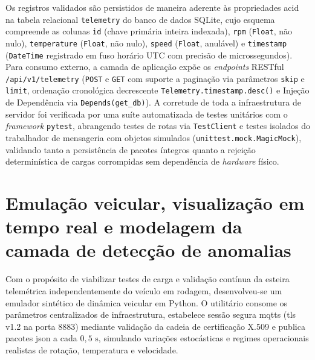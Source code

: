 \documentclass[
	12pt,				%
	openright,			%
	twoside,			%
	a4paper,			%
	english,			%
	brazil				%
	]{abntex2}
\begin{document}
Os registros validados são persistidos de maneira aderente às propriedades
\acrshort{acid} na tabela relacional \texttt{telemetry} do banco de dados SQLite, cujo
esquema compreende as colunas \texttt{id} (chave primária inteira indexada),
\texttt{rpm} (\texttt{Float}, não nulo), \texttt{temperature} (\texttt{Float}, não
nulo), \texttt{speed} (\texttt{Float}, anulável) e \texttt{timestamp} (\texttt{DateTime}
registrado em fuso horário UTC com precisão de microssegundos). Para consumo externo, a
camada de aplicação expõe os \textit{endpoints} RESTful \texttt{/api/v1/telemetry}
(\texttt{POST} e \texttt{GET} com suporte a paginação via parâmetros \texttt{skip} e
\texttt{limit}, ordenação cronológica decrescente
\texttt{Telemetry.\allowbreak timestamp.\allowbreak desc()} e Injeção de Dependência via
\texttt{Depends(get\_db)}). A corretude de toda a infraestrutura de servidor foi
verificada por uma suíte automatizada de testes unitários com o \textit{framework}
\texttt{pytest}, abrangendo testes de rotas via \texttt{TestClient} e testes isolados do
trabalhador de mensageria com objetos simulados
(\texttt{unittest.\allowbreak mock.\allowbreak MagicMock}), validando tanto a
persistência de pacotes íntegros quanto a rejeição determinística de cargas corrompidas
sem dependência de \textit{hardware} físico.

\section{Emulação veicular, visualização em tempo real e modelagem da camada de detecção
de anomalias}

Com o propósito de viabilizar testes de carga e validação contínua da esteira
telemétrica independentemente do veículo em rodagem, desenvolveu-se um emulador
sintético de dinâmica veicular em Python. O utilitário consome os parâmetros
centralizados de infraestrutura, estabelece sessão segura \acrshort{mqtts}
(\acrshort{tls} v1.2 na porta 8883) mediante validação da cadeia de certificação X.509 e
publica pacotes \acrshort{json} a cada $0{,}5\text{ s}$, simulando variações
estocásticas e regimes operacionais realistas de rotação, temperatura e velocidade.
\end{document}

